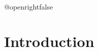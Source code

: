 \documentclass[11pt]{book}
\begin{document}
\csname @openrightfalse\endcsname
\chapter{Introduction}
\setcounter{page}{1}

 










\end{document}
